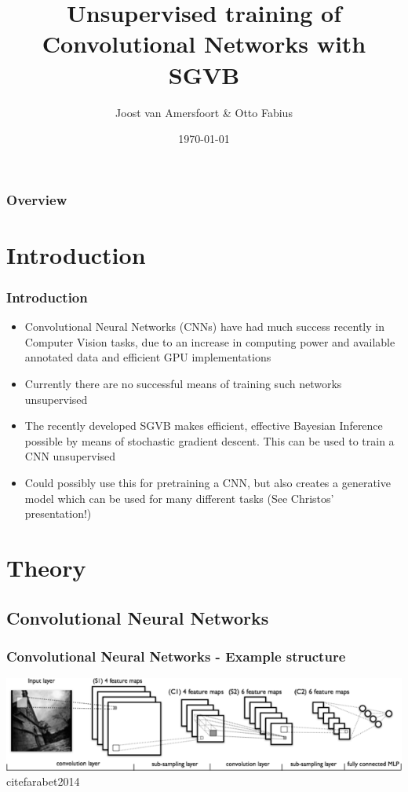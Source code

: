 \documentclass{beamer}
\title[Project Learning Systems]{Unsupervised training of Convolutional Networks with SGVB}
\author{Joost van Amersfoort \& Otto Fabius}
\institute[UvA] 
{University of Amsterdam \\
Supervisor: Diederik Kingma
\medskip
}
\date{\today} %
\begin{document}
\begin{frame}
\titlepage %
\end{frame}

\begin{frame}
\frametitle{Overview}
\tableofcontents 
\end{frame}


\section{Introduction}


\begin{frame}
\frametitle{Introduction}
\begin{itemize}
	\item Convolutional Neural Networks (CNNs) have had much success recently in Computer Vision tasks, due to an increase in computing power and available annotated data and efficient GPU implementations
	\item Currently there are no successful means of training such networks unsupervised
	\item The recently developed SGVB makes efficient, effective Bayesian Inference possible by means of stochastic gradient descent. This can be used to train a CNN unsupervised
	\item Could possibly use this for pretraining a CNN, but also creates a generative model which can be used for many different tasks (See Christos' presentation!)
\end{itemize}
\end{frame}

\section{Theory}

\subsection{Convolutional Neural Networks}

\begin{frame}
\frametitle{Convolutional Neural Networks - Example structure}

\includegraphics[scale = 0.7]{img/convnet.png} \\cite{farabet2014}

\end{frame}
\end{document}
